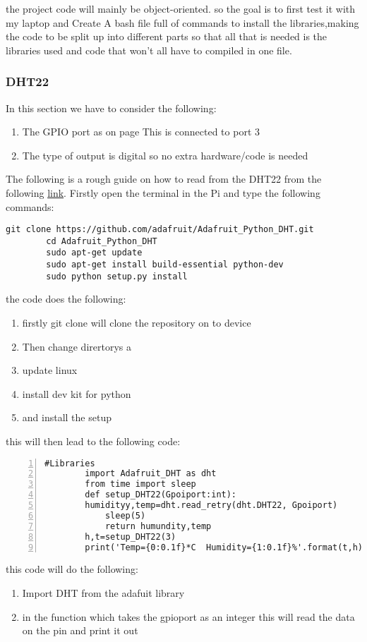 	the project code will mainly be object-oriented. so the goal is to first test it with my laptop and  Create A bash file  full of  commands to install  the libraries,making the code to be split up  into  different parts so that all that is needed is the libraries used and code that won't all have to  compiled in one file.

	\subsubsection{DHT22}
	In this section we have to consider the following: 
	\begin{enumerate}
		\item The GPIO port as on page \pageref{Sychematic for DHT22 revised} This is connected to port 3 
		\item The type of output is digital so no  extra hardware/code is needed
	\end{enumerate}

	The following is  a rough guide on how to read from the DHT22 from the following \href{https://www.instructables.com/Raspberry-Pi-Tutorial-How-to-Use-the-DHT-22/}{link}.
	Firstly open the terminal in the Pi and
	type the following commands:
	\begin{lstlisting}[style=bashstyle]
		git clone https://github.com/adafruit/Adafruit_Python_DHT.git
		cd Adafruit_Python_DHT
		sudo apt-get update
		sudo apt-get install build-essential python-dev
		sudo python setup.py install
	\end{lstlisting}
	the code does the following:
	\begin{enumerate}
		\item firstly git clone will clone the  repository on to device
		\item Then change dirertorys  a
		\item update linux
		\item install dev kit for  python 
		\item and install the setup 
	\end{enumerate}
	
	\newpage
	this will then lead to  the  following code:
	\begin{lstlisting}[style=mystyle,caption={Example code for DHT2},numbers=left,firstnumber=1]
		#Libraries
		import Adafruit_DHT as dht
		from time import sleep
		def setup_DHT22(Gpoiport:int):
		humidityy,temp=dht.read_retry(dht.DHT22, Gpoiport)
			sleep(5)
			return humundity,temp
		h,t=setup_DHT22(3)
		print('Temp={0:0.1f}*C  Humidity={1:0.1f}%'.format(t,h))
	\end{lstlisting}
	this code will do the following:
	\begin{enumerate}
		\item Import DHT from the adafuit library
		\item in the  function which takes the gpioport  as an integer this will read the data on the pin and  print it  out
	\end{enumerate}
	
